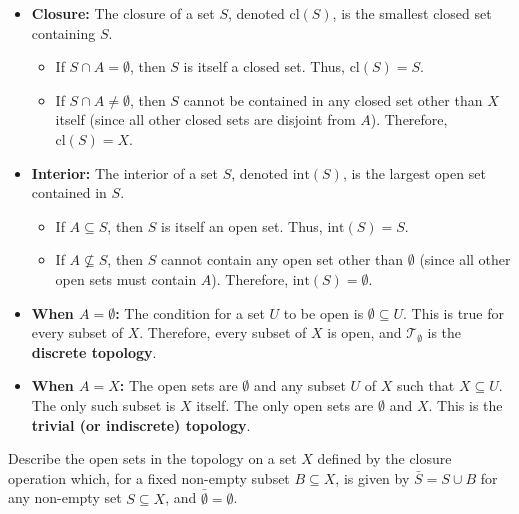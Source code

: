\begin{solution}
  \begin{itemize}
    \item \textbf{Closure:} The closure of a set $S$, denoted $\text{cl}(S)$, is the smallest closed set containing $S$.
    \begin{itemize}
        \item If $S \cap A = \emptyset$, then $S$ is itself a closed set. Thus, $\text{cl}(S) = S$.
        \item If $S \cap A \neq \emptyset$, then $S$ cannot be contained in any closed set other than $X$ itself (since all other closed sets are disjoint from $A$). Therefore, $\text{cl}(S) = X$.
    \end{itemize}

    \item \textbf{Interior:} The interior of a set $S$, denoted $\text{int}(S)$, is the largest open set contained in $S$.
    \begin{itemize}
        \item If $A \subseteq S$, then $S$ is itself an open set. Thus, $\text{int}(S) = S$.
        \item If $A \not\subseteq S$, then $S$ cannot contain any open set other than $\emptyset$ (since all other open sets must contain $A$). Therefore, $\text{int}(S) = \emptyset$.
    \end{itemize}
  \end{itemize}

  \begin{itemize}
    \item \textbf{When $A = \emptyset$:} The condition for a set $U$ to be open is $\emptyset \subseteq U$. This is true for every subset of $X$. Therefore, every subset of $X$ is open, and $\mathcal{T}_{\emptyset}$ is the \textbf{discrete topology}.
    \item \textbf{When $A = X$:} The open sets are $\emptyset$ and any subset $U$ of $X$ such that $X \subseteq U$. The only such subset is $X$ itself. The only open sets are $\emptyset$ and $X$. This is the \textbf{trivial (or indiscrete) topology}.
  \end{itemize}
\end{solution}

\begin{problem}
  Describe the open sets in the topology on a set $X$ defined by the closure operation which, for a fixed non-empty subset $B \subseteq X$, is given by $\bar{S} = S \cup B$ for any non-empty set $S \subseteq X$, and $\bar{\emptyset} = \emptyset$.
\end{problem}

